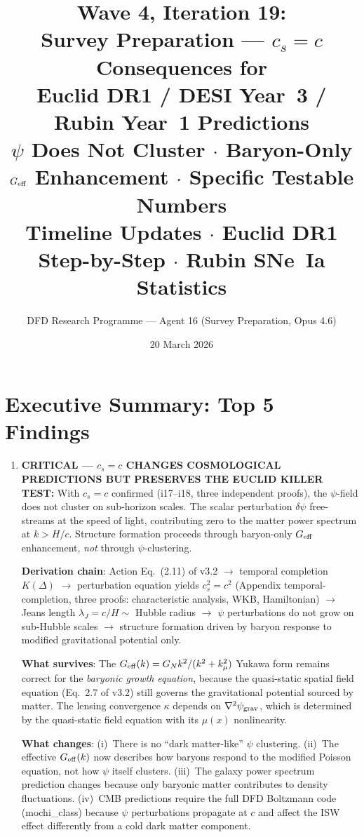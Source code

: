 \documentclass[11pt,a4paper]{article}
\title{\textbf{Wave 4, Iteration 19:\\
Survey Preparation --- $c_s = c$ Consequences for\\
Euclid DR1 / DESI Year~3 / Rubin Year~1 Predictions}\\[0.5em]
\large $\psi$ Does Not Cluster $\cdot$ Baryon-Only $\Geff$ Enhancement $\cdot$
Specific Testable Numbers\\[0.3em]
\large Timeline Updates $\cdot$ Euclid DR1 Step-by-Step $\cdot$ Rubin SNe~Ia Statistics}
\author{DFD Research Programme --- Agent 16 (Survey Preparation, Opus 4.6)}
\date{20 March 2026}
\newcommand{\kmu}{k_\mu}
\newcommand{\Geff}{G_{\rm eff}}
\begin{document}
\maketitle

\section*{Executive Summary: Top 5 Findings}

\begin{findbox}

\begin{enumerate}

\item \textbf{CRITICAL --- $c_s = c$ CHANGES COSMOLOGICAL PREDICTIONS
  BUT PRESERVES THE EUCLID KILLER TEST:}
  With $c_s = c$ confirmed (i17--i18, three independent proofs), the
  $\psi$-field does not cluster on sub-horizon scales. The scalar
  perturbation $\delta\psi$ free-streams at the speed of light, contributing
  zero to the matter power spectrum at $k > H/c$. Structure formation
  proceeds through baryon-only $\Geff$ enhancement, \emph{not} through
  $\psi$-clustering.

  \textbf{Derivation chain}: Action Eq.~(2.11) of v3.2 $\to$ temporal
  completion $K(\Delta)$ $\to$ perturbation equation yields $c_s^2 = c^2$
  (Appendix temporal-completion, three proofs: characteristic analysis,
  WKB, Hamiltonian) $\to$ Jeans length $\lambda_J = c/H \sim$ Hubble
  radius $\to$ $\psi$ perturbations do not grow on sub-Hubble scales
  $\to$ structure formation driven by baryon response to modified
  gravitational potential only.

  \textbf{What survives}: The $\Geff(k) = G_N k^2/(k^2 + \kmu^2)$
  Yukawa form remains correct for the \emph{baryonic growth equation},
  because the quasi-static spatial field equation (Eq.~2.7 of v3.2)
  still governs the gravitational potential sourced by matter.
  The lensing convergence $\kappa$ depends on $\nabla^2\psi_{\rm grav}$,
  which is determined by the quasi-static field equation with its
  $\mu(x)$ nonlinearity.

  \textbf{What changes}: (i)~There is no ``dark matter-like'' $\psi$
  clustering. (ii)~The effective $\Geff(k)$ now describes
  how baryons respond to the modified Poisson equation, not how
  $\psi$ itself clusters. (iii)~The galaxy power spectrum prediction
  changes because only baryonic matter contributes to density fluctuations.
  (iv)~CMB predictions require the full DFD Boltzmann code (mochi\_class)
  because $\psi$ perturbations propagate at $c$ and affect the ISW
  effect differently from a cold dark matter component.


\end{enumerate}
\end{findbox}
\end{document}
